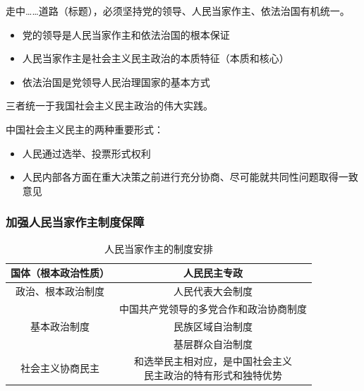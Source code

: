 \documentclass[12pt, a4paper, oneside]{ctexart}
\begin{document}
走中……道路（标题），必须坚持党的领导、人民当家作主、依法治国有机统一。
\begin{itemize}
  \item 党的领导是人民当家作主和依法治国的根本保证
  \item 人民当家作主是社会主义民主政治的本质特征（本质和核心）
  \item 依法治国是党领导人民治理国家的基本方式
\end{itemize}
三者统一于我国社会主义民主政治的伟大实践。

中国社会主义民主的两种重要形式：
\begin{itemize}
  \item 人民通过选举、投票形式权利
  \item 人民内部各方面在重大决策之前进行充分协商、尽可能就共同性问题取得一致意见
\end{itemize}

\subsubsection{加强人民当家作主制度保障}

\begin{table}
  \centering
  \caption{人民当家作主的制度安排}
  \begin{tabular}{|c|c|}
    \hline
    国体（根本政治性质） & 人民民主专政 \\ \hline
    政治、根本政治制度 & 人民代表大会制度 \\ \hline
    \multirow{3}{*}{基本政治制度} & 中国共产党领导的多党合作和政治协商制度 \\ \cline{2-2}
    & 民族区域自治制度 \\ \cline{2-2}
    & 基层群众自治制度 \\ \cline{2-2}
    社会主义协商民主 & \makecell{和选举民主相对应，是中国社会主义\\ 民主政治的特有形式和独特优势} \\
    \hline
  \end{tabular}
\end{table}
\end{document}
